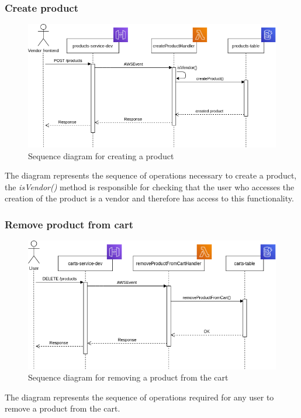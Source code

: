 \subsubsection{Create product}
\begin{figure}[!h]
    \vspace{5px}
    \includegraphics[scale=0.5]{../../../../Images/Diagrammi/maintainerManual/createProductSequence.png}
    \centering
    \caption{Sequence diagram for creating a product}
\end{figure}
The diagram represents the sequence of operations necessary to create a product, the \textit{isVendor()} method is responsible for checking that the user who accesses the creation of the product is a vendor and therefore has access to this functionality.
\pagebreak
\subsubsection{Remove product from cart}
\begin{figure}[!h]
    \vspace{5px}
    \includegraphics[scale=0.5]{../../../../Images/Diagrammi/maintainerManual/removeProductFromCart.png}
    \centering
    \caption{Sequence diagram for removing a product from the cart}
\end{figure}
The diagram represents the sequence of operations required for any user to remove a product from the cart.
\pagebreak
